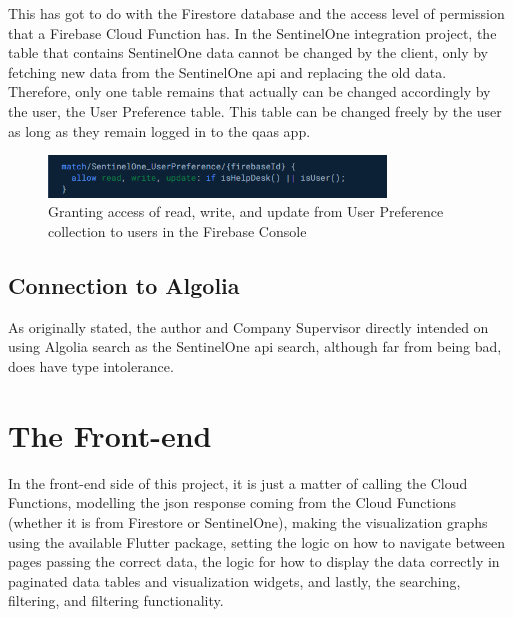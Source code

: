 \begin{multicols}{2}
\begin{itemize}
          This has got to do with the Firestore database and the access level of permission that a Firebase Cloud Function has. In the
          SentinelOne integration project, the table that contains SentinelOne data cannot be changed by the client, only by fetching new
          data from the SentinelOne \acrshort{api} and replacing the old data. Therefore, only one table remains that actually can be
          changed accordingly by the user, the User Preference table. This table can be changed freely by the user as long as they remain
          logged in to the \acrshort{qaas} app.
  \end{itemize}
\end{multicols}

\begin{figure}[htbp]
  \centering
  \includegraphics[width=0.8\textwidth]{Figures/User Preference.png}
  \caption{Granting access of read, write, and update from User Preference collection to users in the Firebase Console}
\end{figure}

\begin{multicols}{2}
  \subsection{Connection to Algolia}

  As originally stated, the author and Company Supervisor directly intended on using Algolia search as the SentinelOne \acrshort{api}
  search, although far from being bad, does have type intolerance.

  \section{The Front-end}

  In the front-end side of this project, it is just a matter of calling the Cloud Functions, modelling the \acrshort{json} response
  coming from the Cloud Functions (whether it is from Firestore or SentinelOne), making the visualization graphs using the available
  Flutter package, setting the logic on how to navigate between pages passing the correct data, the logic for how to display the data
  correctly in paginated data tables and visualization widgets, and lastly, the searching, filtering, and filtering functionality.

\end{multicols}
